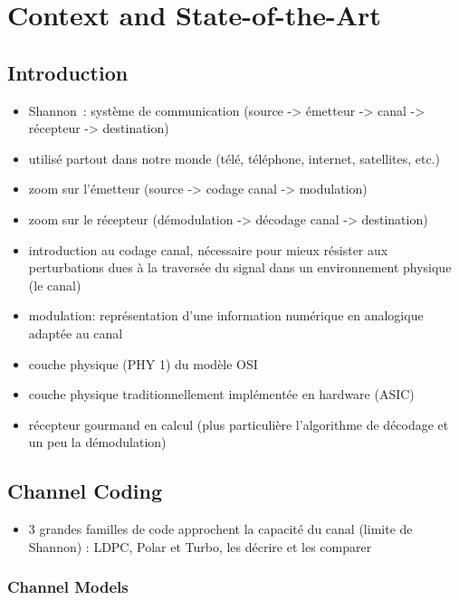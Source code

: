 \chapter{Context and State-of-the-Art}

\section{Introduction}

\begin{itemize}
  \item Shannon~\cite{Shannon1948}: système de communication (source -> émetteur
        -> canal -> récepteur -> destination)
  \item utilisé partout dans notre monde (télé, téléphone, internet, satellites,
        etc.)
  \item zoom sur l'émetteur (source -> codage canal -> modulation)
  \item zoom sur le récepteur (démodulation -> décodage canal -> destination)
  \item introduction au codage canal, nécessaire pour mieux résister aux
        perturbations dues à la traversée du signal dans un environnement
        physique (le canal)
  \item modulation: représentation d'une information numérique en analogique
        adaptée au canal
  \item couche physique (PHY 1) du modèle OSI
  \item couche physique traditionnellement implémentée en hardware (ASIC)
  \item récepteur gourmand en calcul (plus particulière l'algorithme de décodage
        et un peu la démodulation)
\end{itemize}

\section{Channel Coding}

\begin{itemize}
  \item 3 grandes familles de code approchent la capacité du canal (limite de
        Shannon) : LDPC, Polar et Turbo, les décrire et les comparer
\end{itemize}

\subsection{Channel Models}


